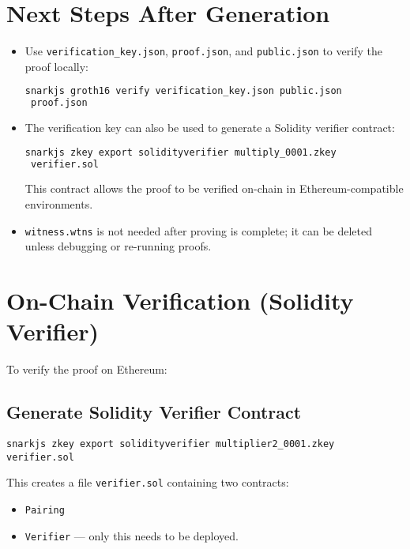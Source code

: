 \documentclass{article}
\begin{document}
	\section*{Next Steps After Generation}
	
	\begin{itemize}
		\item Use \texttt{verification\_key.json}, \texttt{proof.json}, and \texttt{public.json} to verify the proof locally:
		\begin{lstlisting}[language=bash]
snarkjs groth16 verify verification_key.json public.json
 proof.json
		\end{lstlisting}
		
		\item The verification key can also be used to generate a Solidity verifier contract:
		\begin{lstlisting}[language=bash]
snarkjs zkey export solidityverifier multiply_0001.zkey
 verifier.sol
		\end{lstlisting}
		This contract allows the proof to be verified on-chain in Ethereum-compatible environments.
		
		\item \texttt{witness.wtns} is not needed after proving is complete; it can be deleted unless debugging or re-running proofs.
	\end{itemize}
	
	\section*{On-Chain Verification (Solidity Verifier)}
	
	To verify the proof on Ethereum:
	
	\subsection*{Generate Solidity Verifier Contract}
	
	\begin{tcolorbox}[title=Export Solidity Verifier]
		\begin{lstlisting}
snarkjs zkey export solidityverifier multiplier2_0001.zkey 
verifier.sol
		\end{lstlisting}
	\end{tcolorbox}
	
	This creates a file \texttt{verifier.sol} containing two contracts:
	\begin{itemize}
		\item \texttt{Pairing}
		\item \texttt{Verifier} — only this needs to be deployed.
	\end{itemize}
	
\end{document}
